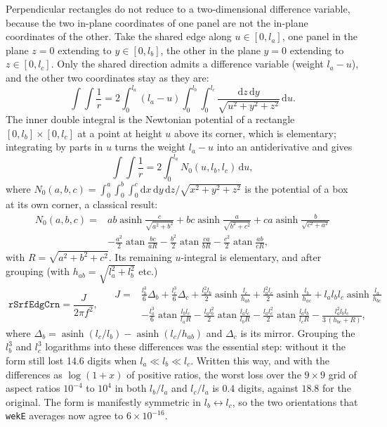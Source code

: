 \documentclass[11pt]{article}
\theoremstyle{remark}
\newcommand{\dd}{\mathrm{d}}
\newcommand{\asinh}{\operatorname{asinh}}
\newcommand{\atan}{\operatorname{atan}}
\newcommand{\code}[1]{\texttt{#1}}
\begin{document}
Perpendicular rectangles do not reduce to a two-dimensional difference variable,
because the two in-plane coordinates of one panel are not the in-plane coordinates of
the other. Take the shared edge along $u\in[0,l_a]$, one panel in the plane $z=0$
extending to $y\in[0,l_b]$, the other in the plane $y=0$ extending to $z\in[0,l_c]$.
Only the shared direction admits a difference variable (weight $l_a - u$), and the
other two coordinates stay as they are:
\begin{equation}
\int\!\!\int\frac{1}{r} = 2\int_0^{l_a}(l_a-u)\int_0^{l_b}\!\!\int_0^{l_c}
\frac{\dd z\,\dd y}{\sqrt{u^2+y^2+z^2}}\,\dd u .
\end{equation}
The inner double integral is the Newtonian potential of a rectangle $[0,l_b]\times
[0,l_c]$ at a point at height $u$ above its corner, which is elementary; integrating
by parts in $u$ turns the weight $l_a - u$ into an antiderivative and gives
\begin{equation}
\int\!\!\int\frac{1}{r} = 2\int_0^{l_a} N_0(u, l_b, l_c)\,\dd u,
\end{equation}
where $N_0(a,b,c) = \int_0^a\!\int_0^b\!\int_0^c \dd x\,\dd y\,\dd z/\sqrt{x^2+y^2+z^2}$
is the potential of a box at its own corner, a classical result:
\begin{equation}
\begin{aligned}
N_0(a,b,c) = {}& ab\asinh\frac{c}{\sqrt{a^2+b^2}} + bc\asinh\frac{a}{\sqrt{b^2+c^2}} + ca\asinh\frac{b}{\sqrt{c^2+a^2}}\\
& - \frac{a^2}{2}\atan\frac{bc}{aR} - \frac{b^2}{2}\atan\frac{ca}{bR} - \frac{c^2}{2}\atan\frac{ab}{cR},
\end{aligned}
\label{eq:N0}
\end{equation}
with $R = \sqrt{a^2+b^2+c^2}$. Its remaining $u$-integral is elementary, and after
grouping (with $h_{ab} = \sqrt{l_a^2+l_b^2}$ etc.)
\begin{equation}
\boxed{\;
\code{rSrfEdgCrn} = \frac{J}{2\pi f^2},\;}
\quad
\begin{aligned}
J = {}& \tfrac{l_b^3}{6}\Delta_b + \tfrac{l_c^3}{6}\Delta_c
+ \tfrac{l_a^2 l_b}{2}\asinh\tfrac{l_c}{h_{ab}} + \tfrac{l_a^2 l_c}{2}\asinh\tfrac{l_b}{h_{ac}}
+ l_a l_b l_c\asinh\tfrac{l_a}{h_{bc}} \\
& - \tfrac{l_a^3}{6}\atan\tfrac{l_b l_c}{l_a R} - \tfrac{l_a l_b^2}{2}\atan\tfrac{l_a l_c}{l_b R}
- \tfrac{l_a l_c^2}{2}\atan\tfrac{l_a l_b}{l_c R} - \frac{l_a^2 l_b l_c}{3\,(h_{bc}+R)},
\end{aligned}
\label{eq:crn}
\end{equation}
where $\Delta_b = \asinh(l_c/l_b) - \asinh(l_c/h_{ab})$ and $\Delta_c$ is its mirror.
Grouping the $l_b^3$ and $l_c^3$ logarithms into these differences was the essential
step: without it the form still lost 14.6 digits when $l_a \ll l_b \ll l_c$. Written
this way, and with the differences as $\log(1+x)$ of positive ratios, the worst loss
over the $9\times 9$ grid of aspect ratios $10^{-4}$ to $10^{4}$ in both $l_b/l_a$ and
$l_c/l_a$ is $0.4$ digits, against $18.8$ for the original. The form is manifestly
symmetric in $l_b\leftrightarrow l_c$, so the two orientations that \code{wekE}
averages now agree to $6\times 10^{-16}$.
\end{document}
